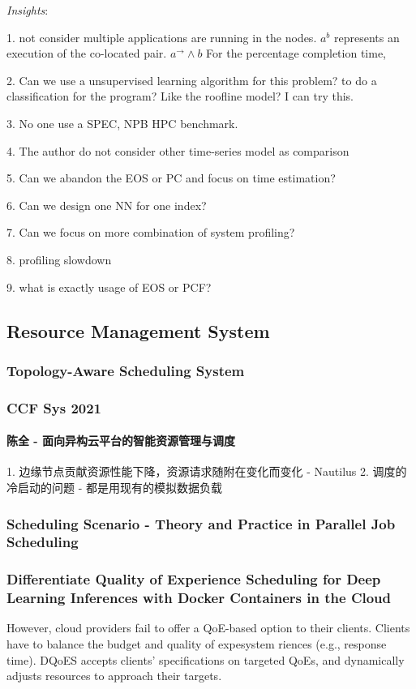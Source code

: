 \documentclass[UTF8]{article}
\begin{document}
\emph{Insights}: 

1. not consider multiple applications are running in the nodes. $a^b$ represents an execution of the co-located pair. $a^{\rightarrow} \wedge b$ For the percentage completion time, 

2. Can we use a unsupervised learning algorithm for this problem?  to do a classification for the program?  Like the roofline model? I can try this.

3. No one use a SPEC, NPB HPC benchmark.

4. The author do not consider other time-series model as comparison

5. Can we abandon the EOS or PC and focus on time estimation?

6. Can we design one NN for one index?

7. Can we focus on more combination of system profiling?

8. profiling slowdown

9. what is exactly usage of EOS or PCF?

\subsection{Resource Management System}
\subsubsection{Topology-Aware Scheduling System}
\subsubsection{CCF Sys 2021}
\paragraph{陈全 - 面向异构云平台的智能资源管理与调度}
1. 边缘节点贡献资源性能下降，资源请求随附在变化而变化 - Nautilus
2. 调度的冷启动的问题 - 都是用现有的模拟数据负载


\subsubsection{Scheduling Scenario - Theory and Practice in Parallel Job Scheduling}
\subsubsection{Differentiate Quality of Experience Scheduling for Deep Learning Inferences with Docker Containers in the Cloud}
However, cloud providers fail to offer a QoE-based option to their clients. Clients have to balance the budget and quality of expesystem
riences (e.g., response time). DQoES accepts clients’ specifications on targeted QoEs, and dynamically adjusts resources to approach their targets. 
\end{document}
